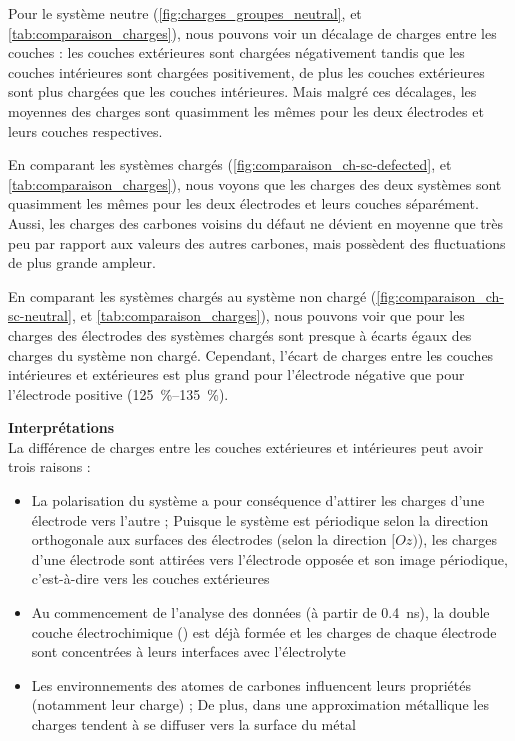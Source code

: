 Pour le système neutre (\autoref{fig:charges_groupes_neutral}, et \autoref{tab:comparaison_charges}), nous pouvons voir un décalage de charges entre les couches : les couches extérieures sont chargées négativement tandis que les couches intérieures sont chargées positivement, de plus les couches extérieures sont plus chargées que les couches intérieures. Mais malgré ces décalages, les moyennes des charges sont quasimment les mêmes pour les deux électrodes et leurs couches respectives.

En comparant les systèmes chargés (\autoref{fig:comparaison_ch-sc-defected}, et \autoref{tab:comparaison_charges}), nous voyons que les charges des deux systèmes sont quasimment les mêmes pour les deux électrodes et leurs couches séparément.\\
Aussi, les charges des carbones voisins du défaut ne dévient en moyenne que très peu par rapport aux valeurs des autres carbones, mais possèdent des fluctuations de plus grande ampleur.

En comparant les systèmes chargés au système non chargé (\autoref{fig:comparaison_ch-sc-neutral}, et \autoref{tab:comparaison_charges}), nous pouvons voir que pour les charges des électrodes des systèmes chargés sont presque à écarts égaux des charges du système non chargé. Cependant, l'écart de charges entre les couches intérieures et extérieures est plus grand pour l'électrode négative que pour l'électrode positive (\qtyrange[range-units = single]{125}{135}{\percent}).

\textbf{Interprétations}\\
La différence de charges entre les couches extérieures et intérieures peut avoir trois raisons :
\begin{itemize}
    \item La polarisation du système a pour conséquence d'attirer les charges d'une électrode vers l'autre ; Puisque le système est périodique selon la direction orthogonale aux surfaces des électrodes (selon la direction $[Oz)$), les charges d'une électrode sont attirées vers l'électrode opposée et son image périodique, c'est-à-dire vers les couches extérieures
    \item Au commencement de l'analyse des données (à partir de \qty{0.4}{\nano \second}), la double couche électrochimique (\edl{}) est déjà formée et les charges de chaque électrode sont concentrées à leurs interfaces avec l'électrolyte
    \item Les environnements des atomes de carbones influencent leurs propriétés (notamment leur charge) ; De plus, dans une approximation métallique les charges tendent à se diffuser vers la surface du métal
\end{itemize}

